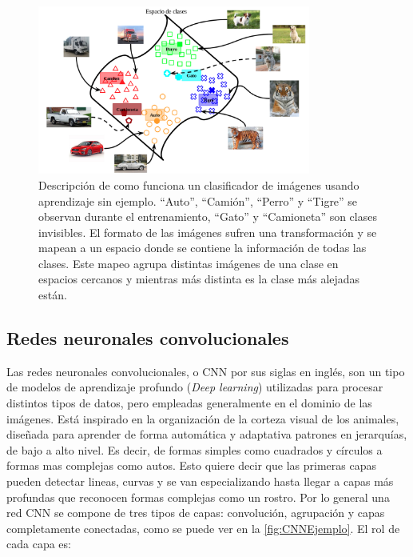 \begin{figure}[]
	\centering
	\includegraphics[width=0.8\textwidth]{img/Modelo.png}
	\caption{Descripción de como funciona un clasificador de imágenes usando aprendizaje sin ejemplo. ``Auto'', ``Camión'', ``Perro'' y ``Tigre'' se observan  durante el entrenamiento,  ``Gato'' y ``Camioneta'' son clases invisibles. El formato de las imágenes sufren una transformación y se mapean a un espacio donde se contiene la información de todas las clases. Este mapeo agrupa distintas imágenes de una clase en espacios cercanos y mientras más distinta es la clase más alejadas están.}
	\label{fig:EjemploZSD}
\end{figure}


\subsection{Redes neuronales convolucionales} \label{sec:redesneuronalesconvolucionales}
Las redes neuronales convolucionales, o CNN por sus siglas en inglés, son un tipo de modelos de aprendizaje profundo (\textit{Deep learning}) utilizadas  para procesar distintos tipos de datos, pero empleadas generalmente en el dominio de las imágenes. Está inspirado en la organización de la corteza visual de los animales, diseñada para aprender de forma automática y adaptativa patrones en jerarquías, de bajo a alto nivel. Es decir, de formas simples como cuadrados y círculos a formas mas complejas como autos. Esto quiere decir que las primeras capas pueden detectar lineas, curvas y se van especializando hasta llegar a capas más profundas que reconocen formas complejas como un rostro. Por lo general una red CNN se compone de tres tipos de capas: convolución, agrupación y capas completamente conectadas, como se puede ver en la \autoref{fig:CNNEjemplo}. El rol de cada capa es:

